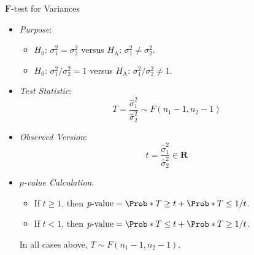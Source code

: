 \begin{Statistical_Test}{$ \symbf{F} $-test for Variances}{}
      \begin{itemize}
            \item \emph{Purpose}:
                  \begin{itemize}
                        \item $ H_0 $: $ \sigma_1^2=\sigma_2^2 $ versus $ H_\text{A} $: $ \sigma_1^2\ne \sigma_2^2 $.
                        \item $ H_0 $: $ \sigma_1^2/\sigma_2^2=1 $ versus $ H_\text{A} $: $ \sigma_1^2/\sigma_2^2\ne 1 $.
                  \end{itemize}
            \item \emph{Test Statistic}:
                  \[ T=\frac{\hat{\sigma}_1^2}{\hat{\sigma}_2^2}\sim F(n_1-1,n_2-1)  \]
            \item \emph{Observed Version}:
                  \[ t=\frac{\hat{\sigma}_1^2}{\hat{\sigma}_2^2}\in\mathbf{R}   \]
            \item \emph{$ p $-value Calculation}:
                  \begin{itemize}
                        \item If $ t\ge 1 $, then $ p\text{-value}=\Prob*{T\ge t}+\Prob*{T\le 1/t} $.
                        \item If $ t<1 $, then $ p\text{-value}=\Prob*{T\le t}+\Prob*{T\ge 1/t} $.
                  \end{itemize}
                  \begin{Remark}{}{}
                        In all cases above, $ T \sim F(n_1-1,n_2-1) $.
                  \end{Remark}
      \end{itemize}
\end{Statistical_Test}
